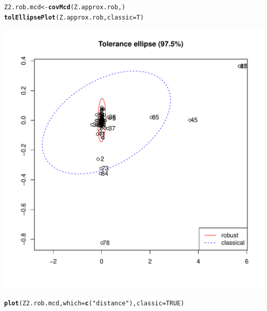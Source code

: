 \documentclass[a4paper,oneside,12pt,titlepage]{article}\usepackage[]{graphicx}\usepackage[]{color}
\makeatletter
\def\maxwidth{ %
  \ifdim\Gin@nat@width>\linewidth
    \linewidth
  \else
    \Gin@nat@width
  \fi
}
\newcommand{\hlnum}[1]{\textcolor[rgb]{0.686,0.059,0.569}{#1}}%
\newcommand{\hlstr}[1]{\textcolor[rgb]{0.192,0.494,0.8}{#1}}%
\newcommand{\hlstd}[1]{\textcolor[rgb]{0.345,0.345,0.345}{#1}}%
\newcommand{\hlkwb}[1]{\textcolor[rgb]{0.69,0.353,0.396}{#1}}%
\newcommand{\hlkwc}[1]{\textcolor[rgb]{0.333,0.667,0.333}{#1}}%
\newcommand{\hlkwd}[1]{\textcolor[rgb]{0.737,0.353,0.396}{\textbf{#1}}}%
\newenvironment{kframe}{%
 \def\at@end@of@kframe{}%
 \ifinner\ifhmode%
  \def\at@end@of@kframe{\end{minipage}}%
  \begin{minipage}{\columnwidth}%
 \fi\fi%
 \def\FrameCommand##1{\hskip\@totalleftmargin \hskip-\fboxsep
 \colorbox{shadecolor}{##1}\hskip-\fboxsep
     \hskip-\linewidth \hskip-\@totalleftmargin \hskip\columnwidth}%
 \MakeFramed {\advance\hsize-\width
   \@totalleftmargin\z@ \linewidth\hsize
   \@setminipage}}%
 {\par\unskip\endMakeFramed%
 \at@end@of@kframe}
\newenvironment{knitrout}{}{} %
\makeatother
\begin{document}
\begin{knitrout}
\color{fgcolor}\begin{kframe}
\begin{alltt}
\hlstd{Z2.rob.mcd} \hlkwb{<-} \hlkwd{covMcd}\hlstd{(Z.approx.rob,)}
\hlkwd{tolEllipsePlot}\hlstd{(Z.approx.rob,}\hlkwc{classic} \hlstd{= T)}
\end{alltt}
\end{kframe}
\includegraphics[width=\maxwidth]{figure/unnamed-chunk-14-1} 
\begin{kframe}\begin{alltt}
\hlkwd{plot}\hlstd{(Z2.rob.mcd,}\hlkwc{which} \hlstd{=} \hlkwd{c}\hlstd{(}\hlstr{"distance"}\hlstd{),}\hlkwc{classic} \hlstd{=} \hlnum{TRUE}\hlstd{)}
\end{alltt}
\end{kframe}

\end{knitrout}
\end{document}
